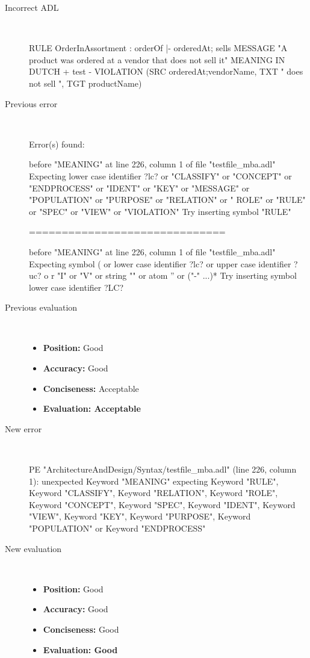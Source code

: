 \hrulefill

\begin{description}
  \item[Incorrect ADL]~\\
\begin{adl}
RULE OrderInAssortment : orderOf |- orderedAt; sells 
MESSAGE "A product was ordered at a vendor that does not sell it"
MEANING IN DUTCH  {+ test -}
VIOLATION (SRC orderedAt;vendorName, TXT " does not sell ", TGT productName)
\end{adl}
  \item[Previous error]~\\
\begin{haskell}
Error(s) found:

before "MEANING" at line 226, column 1 of file "testfile_mba.adl"
Expecting lower case identifier ?lc? or "CLASSIFY" or "CONCEPT" or "ENDPROCESS"
or "IDENT" or "KEY" or "MESSAGE" or "POPULATION" or "PURPOSE" or "RELATION" or "
ROLE" or "RULE" or "SPEC" or "VIEW" or "VIOLATION"
Try inserting symbol "RULE"

==============================

before "MEANING" at line 226, column 1 of file "testfile_mba.adl"
Expecting symbol ( or lower case identifier ?lc? or upper case identifier ?uc? o
r "I" or "V" or string "" or atom '' or ("-" ...)*
Try inserting symbol lower case identifier ?LC?
\end{haskell}
  \item[Previous evaluation]~\\
    \begin{itemize}
    \item \textbf{Position:} Good
    \item \textbf{Accuracy:} Good
    \item \textbf{Conciseness:} Acceptable
    \item \textbf{Evaluation: Acceptable}
    \end{itemize}
  \item[New error]~\\
\begin{haskell}
PE "ArchitectureAndDesign/Syntax/testfile_mba.adl" (line 226, column 1):
unexpected Keyword "MEANING"
expecting Keyword "RULE", Keyword "CLASSIFY", Keyword "RELATION", Keyword "ROLE", Keyword "CONCEPT", Keyword "SPEC", Keyword "IDENT", Keyword "VIEW", Keyword "KEY", Keyword "PURPOSE", Keyword "POPULATION" or Keyword "ENDPROCESS"
\end{haskell}
  \item[New evaluation]~\\
    \begin{itemize}
    \item \textbf{Position:} Good
    \item \textbf{Accuracy:} Good
    \item \textbf{Conciseness:} Good
    \item \textbf{Evaluation: Good}
    \end{itemize}
  \end{description}


